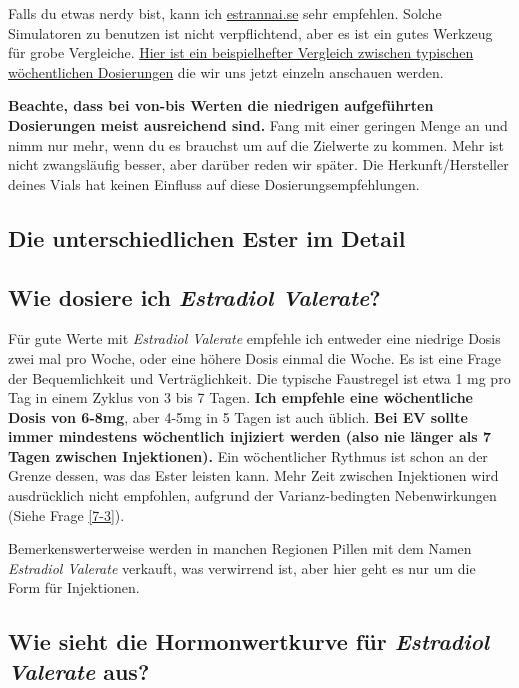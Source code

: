 \documentclass{article}
\begin{document}
Falls du etwas nerdy bist, kann ich \href{http://estrannai.se}{estrannai.se} sehr empfehlen. Solche Simulatoren zu benutzen ist nicht verpflichtend, aber es ist ein gutes Werkzeug für grobe Vergleiche. \href{https://estrannai.se/\#i0__cu,7,7,1-cu,5,7,3-cu,5,7,2}{Hier ist ein beispielhefter Vergleich zwischen typischen wöchentlichen Dosierungen} die wir uns jetzt einzeln anschauen werden.

\textbf{Beachte, dass bei von-bis Werten die niedrigen aufgeführten Dosierungen meist ausreichend sind.} Fang mit einer geringen Menge an und nimm nur mehr, wenn du es brauchst um auf die Zielwerte zu kommen. Mehr ist nicht zwangsläufig besser, aber darüber reden wir später. Die Herkunft/Hersteller deines Vials hat keinen Einfluss auf diese Dosierungsempfehlungen.

\subsection*{Die unterschiedlichen Ester im Detail}

\subsection{Wie dosiere ich \textit{Estradiol Valerate}?}

Für gute Werte mit \textit{Estradiol Valerate} empfehle ich entweder eine niedrige Dosis zwei mal pro Woche, oder eine höhere Dosis einmal die Woche. Es ist eine Frage der Bequemlichkeit und Verträglichkeit. Die typische Faustregel ist etwa 1 mg pro Tag in einem Zyklus von 3 bis 7 Tagen. \textbf{Ich empfehle eine wöchentliche Dosis von 6-8mg}, aber 4-5mg in  5 Tagen ist auch üblich. \textbf{Bei EV sollte immer mindestens wöchentlich injiziert werden (also nie länger als 7 Tagen zwischen Injektionen).} Ein wöchentlicher Rythmus ist schon an der Grenze dessen, was das Ester leisten kann. Mehr Zeit zwischen Injektionen wird ausdrücklich nicht empfohlen, aufgrund der Varianz-bedingten Nebenwirkungen (Siehe Frage \ref{7-3}).

Bemerkenswerterweise werden in manchen Regionen Pillen mit dem Namen \textit{Estradiol Valerate} verkauft, was verwirrend ist, aber hier geht es nur um die Form für Injektionen.

\subsection{Wie sieht die Hormonwertkurve für \textit{Estradiol Valerate} aus?}
\end{document}
